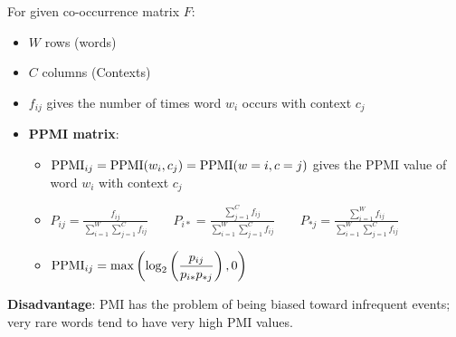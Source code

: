 For given co-occurrence matrix $F$:
\begin{itemize}
    \item $W$ rows (words)
    \item $C$ columns (Contexts)
    \item $f_{ij}$ gives the number of times word $w_i$ occurs with context $c_j$
    \item \textbf{PPMI matrix}\label{PPMI matrix}: 
    \begin{itemize}
        \item $\operatorname{PPMI}_{ij} = \operatorname{PPMI}(w_i, c_j) = \operatorname{PPMI}(w = i, c = j)$ gives the PPMI value of word $w_i$ with context $c_j$
        
        \item \( \displaystyle P_{ij}=\frac{f_{ij}}{\displaystyle\sum_{i=1}^{W} \sum_{j=1}^{C} f_{ij}}  \quad\quad P_{i*}=\frac{\displaystyle\sum_{j=1}^{C} f_{ij}}{\displaystyle\sum_{i=1}^{W} \sum_{j=1}^{C} f_{ij}} \quad\quad P_{*j}=\frac{\displaystyle\sum_{i=1}^{W} f_{ij}}{\displaystyle\sum_{i=1}^{W} \sum_{j=1}^{C} f_{ij}} \)
        
        \item \( \displaystyle \operatorname{PPMI}_{ij} = \max\left( \log_2\left( \frac{p_{ij}}{p_{i*}p_{*j}} \right),0\right) \)
        
    \end{itemize}
\end{itemize}

\vspace{0.2cm}
\textbf{Disadvantage}: PMI has the problem of being biased toward infrequent events; very rare words tend to have very high PMI values.


